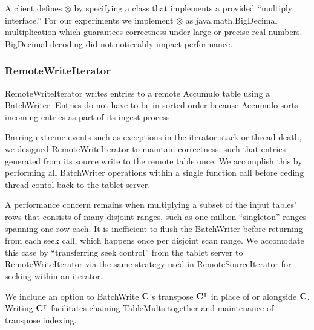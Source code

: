 A client defines $\otimes$ by specifying a class 
that implements a provided ``multiply interface.''
For our experiments we implement $\otimes$ as java.math.BigDecimal multiplication
which guarantees correctness under large or precise real numbers.
BigDecimal decoding did not noticeably impact performance.

\subsubsection{RemoteWriteIterator}
RemoteWriteIterator writes entries to a remote Accumulo table using a BatchWriter. %
Entries do not have to be in sorted order because Accumulo sorts incoming entries as part of its
 ingest process. 

Barring extreme events such as exceptions in the iterator stack or thread death,
we designed RemoteWriteIterator to maintain correctness, such that entries generated from
its source write to the remote table once.
We accomplish this by performing all BatchWriter operations within a single function call
before ceding thread contol back to the tablet server.  

A performance concern remains when multiplying a subset of the input tables' rows 
that consists of many disjoint ranges, such as one million ``singleton'' ranges spanning one row each.
It is inefficient to flush the BatchWriter before returning from each seek call, which happens once per 
disjoint scan range. %
We accomodate this case by ``transferring seek control'' %
from the tablet server to RemoteWriteIterator 
via the same strategy used in RemoteSourceIterator for seeking within an iterator.

We include an option to BatchWrite $\mathbf{C}$'s transpose $\mathbf{C^{\intercal}}$ in place of or alongside $\mathbf{C}$. 
Writing $\mathbf{C^{\intercal}}$ facilitates chaining TableMults together
and maintenance of transpose indexing.

